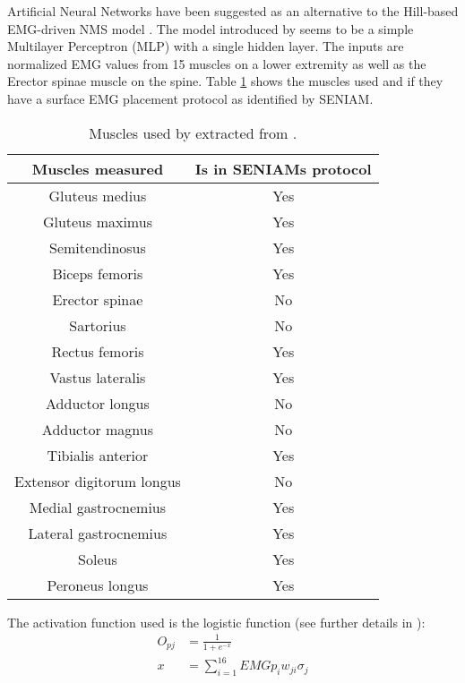 Artificial Neural Networks have been suggested as an alternative to the Hill-based EMG-driven NMS model \cite{Sepulveda1993, Rosen1999}.
The model introduced by  seems to be a simple Multilayer Perceptron (MLP) with a single hidden layer. 
The inputs are normalized EMG values from 15 muscles on a lower extremity as well as the Erector spinae muscle on the spine. 
Table \ref{tab:SepulvedaTable} shows the muscles used and if they have a surface EMG placement protocol as identified by SENIAM.
\begin{table}[t]
    \centering
    \begin{tabular}{c|c}
        Muscles measured & Is in SENIAMs protocol \\ \hline
        Gluteus medius              & Yes \\
        Gluteus maximus             & Yes \\
        Semitendinosus              & Yes \\
        Biceps femoris              & Yes \\
        Erector spinae              & No  \\
        Sartorius                   & No  \\
        Rectus femoris              & Yes \\
        Vastus lateralis            & Yes \\
        Adductor longus             & No  \\
        Adductor magnus             & No  \\
        Tibialis anterior           & Yes \\
        Extensor digitorum longus   & No  \\
        Medial gastrocnemius        & Yes \\
        Lateral gastrocnemius       & Yes \\
        Soleus                      & Yes \\
        Peroneus longus             & Yes
    \end{tabular}
    \caption{Muscles used by  extracted from \cite[Tab. 1]{Sepulveda1993}. }
    \label{tab:SepulvedaTable}
\end{table}
The activation function used is the logistic function (see further details in \cite[eq. (1)]{Sepulveda1993}):
\begin{align}
    O_{pj} &= \frac{1}{1+e^{-x}}\\
    x &= \sum_{i=1}^{16}EMG p_i w_{ji} \sigma_j
\end{align}
